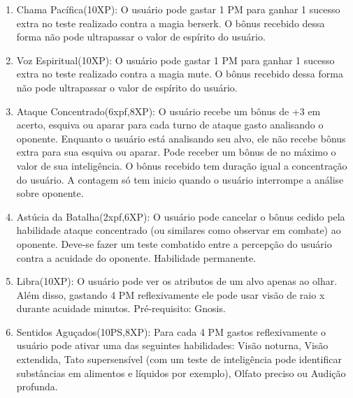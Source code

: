 \begin{enumerate}
	\item Chama Pacífica(10XP): O usuário pode gastar 1 PM para ganhar 1 sucesso extra no teste realizado contra a magia berserk. O bônus recebido dessa forma não pode ultrapassar o valor de espírito do usuário.
		
	\item Voz Espiritual(10XP): O usuário pode gastar 1 PM para ganhar 1 sucesso extra no teste realizado contra a magia mute. O bônus recebido dessa forma não pode ultrapassar o valor de espírito do usuário.

	\item Ataque Concentrado(6xpf,8XP): O usuário recebe um bônus de +3 em acerto, esquiva ou aparar para cada turno de ataque gasto analisando o oponente. Enquanto o usuário está analisando seu alvo, ele não recebe bônus extra para sua esquiva ou aparar. Pode receber um bônus de no máximo o valor de sua inteligência. O bônus recebido tem duração igual a concentração do usuário. A contagem só tem inicio quando o usuário interrompe a análise sobre oponente.

	\item Astúcia da Batalha(2xpf,6XP): O usuário pode cancelar o bônus cedido pela habilidade ataque concentrado (ou similares como observar em combate) ao oponente. Deve-se fazer um teste combatido entre a percepção do usuário contra a acuidade do oponente. Habilidade permanente.
	

	\item Libra(10XP): O usuário pode ver os atributos de um alvo apenas ao olhar. Além disso, gastando 4 PM reflexivamente ele pode usar visão de raio x durante acuidade minutos. Pré-requisito: Gnosis.
	
	\item Sentidos Aguçados(10PS,8XP): Para cada 4 PM gastos reflexivamente o usuário pode ativar uma das seguintes habilidades: Visão noturna, Visão extendida, Tato supersensível (com um teste de inteligência pode identificar substâncias em alimentos e líquidos por exemplo), Olfato preciso ou Audição profunda.



\end{enumerate}
